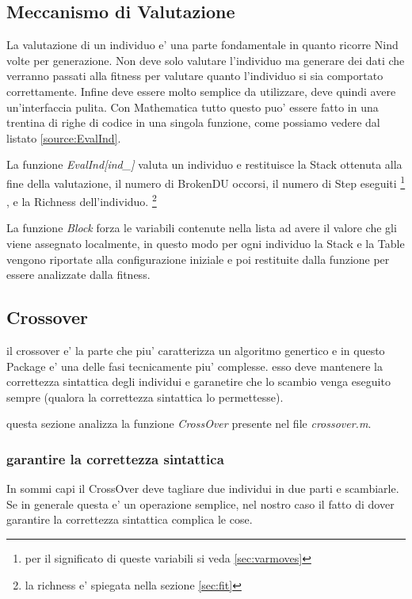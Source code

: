\documentclass[12pt, a4paper]{article}
\begin{document}
\lstset{caption=la funzione HAC per la generazione ricorsiva degli individui,
		label=source:HAC}



\subsection{Meccanismo di Valutazione}
\label{sec:valmec}
La valutazione di un individuo e' una parte fondamentale in quanto ricorre Nind volte per generazione. Non deve solo valutare l'individuo ma generare dei dati che verranno passati alla fitness per valutare quanto l'individuo si sia comportato correttamente. Infine deve essere molto semplice da utilizzare, deve quindi avere un'interfaccia pulita. Con Mathematica tutto questo puo' essere fatto in una trentina di righe di codice in una singola funzione, come possiamo vedere dal listato \ref{source:EvalInd}.

La funzione {\itshape EvalInd[ind\_]} valuta un individuo e restituisce la Stack ottenuta alla fine della valutazione, il numero di BrokenDU occorsi, il numero di Step eseguiti
\footnote{ per il significato di queste variabili si veda \ref{sec:varmoves}}
, e la Richness dell'individuo.
\footnote{la richness e' spiegata nella sezione \ref{sec:fit}}

La funzione {\itshape Block} forza le variabili contenute nella lista ad avere il valore che gli viene assegnato localmente, in questo modo per ogni individuo la Stack e la Table vengono riportate alla configurazione iniziale e poi restituite dalla funzione per essere analizzate dalla fitness.

\lstset{caption=funzione che valuta un individuo , label=source:EvalInd}




\subsection{Crossover}
il crossover e' la parte che piu' caratterizza un algoritmo genertico e in questo Package e' una delle fasi tecnicamente piu' complesse.
esso deve mantenere la correttezza sintattica degli individui e garanetire che lo scambio venga eseguito sempre (qualora la correttezza sintattica lo permettesse).

questa sezione analizza la funzione {\itshape CrossOver} presente nel file {\itshape crossover.m}.

\subsubsection{garantire la correttezza sintattica}
In sommi capi il CrossOver deve tagliare due individui in due parti e scambiarle. Se in generale questa e' un operazione semplice, nel nostro caso il fatto di dover garantire la correttezza sintattica complica le cose. 
\end{document}
